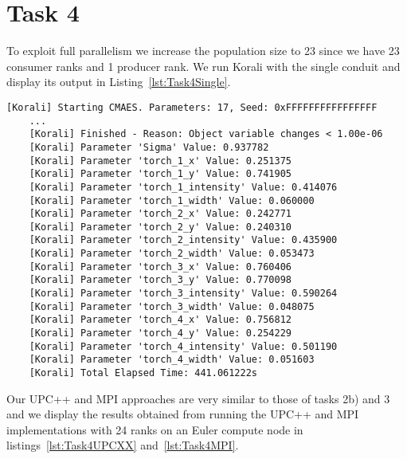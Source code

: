 \documentclass[11pt]{article}
\begin{document}
    \section*{Task 4}
    \label{sec:Task4}

    To exploit full parallelism we increase the population size to 23 since
    we have 23 consumer ranks and 1 producer rank.
    We run Korali with the single conduit and display its output in
    Listing~\ref{lst:Task4Single}.

    \begin{lstlisting}[basicstyle=\tiny, frame=single, caption={Korali
    output for the single conduit when running the code from Task 1 with
    population size 23.}, label={lst:Task4Single}]
    [Korali] Starting CMAES. Parameters: 17, Seed: 0xFFFFFFFFFFFFFFFF
    ...
    [Korali] Finished - Reason: Object variable changes < 1.00e-06
    [Korali] Parameter 'Sigma' Value: 0.937782
    [Korali] Parameter 'torch_1_x' Value: 0.251375
    [Korali] Parameter 'torch_1_y' Value: 0.741905
    [Korali] Parameter 'torch_1_intensity' Value: 0.414076
    [Korali] Parameter 'torch_1_width' Value: 0.060000
    [Korali] Parameter 'torch_2_x' Value: 0.242771
    [Korali] Parameter 'torch_2_y' Value: 0.240310
    [Korali] Parameter 'torch_2_intensity' Value: 0.435900
    [Korali] Parameter 'torch_2_width' Value: 0.053473
    [Korali] Parameter 'torch_3_x' Value: 0.760406
    [Korali] Parameter 'torch_3_y' Value: 0.770098
    [Korali] Parameter 'torch_3_intensity' Value: 0.590264
    [Korali] Parameter 'torch_3_width' Value: 0.048075
    [Korali] Parameter 'torch_4_x' Value: 0.756812
    [Korali] Parameter 'torch_4_y' Value: 0.254229
    [Korali] Parameter 'torch_4_intensity' Value: 0.501190
    [Korali] Parameter 'torch_4_width' Value: 0.051603
    [Korali] Total Elapsed Time: 441.061222s
    \end{lstlisting}

    Our UPC++ and MPI approaches are very similar to those of tasks 2b) and
    3 and we display the results obtained from running the UPC++ and MPI
    implementations with 24 ranks on an Euler compute node in
    listings~\ref{lst:Task4UPCXX} and~\ref{lst:Task4MPI}.
\end{document}
